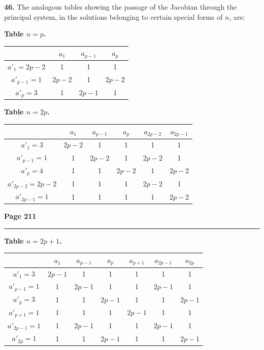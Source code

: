 \documentclass[12pt,a4paper]{article}
\theoremstyle{plain}
\theoremstyle{definition}
\theoremstyle{remark}
\begin{document}
\textbf{46.} The analogous tables showing the passage of the Jacobian through the principal system, in the solutions belonging to certain special forms of $n$, are:

\smallskip

\noindent\textbf{Table $n = p$.}

\begin{tabular}{c|ccc}
 & $a_1$ & $a_{p-1}$ & $a_p$ \\
\hline
$a'_1 = 2p-2$ & 1 & 1 & 1 \\
$a'_{p-1} = 1$ & $2p-2$ & 1 & $2p-2$ \\
$a'_p = 3$ & 1 & $2p-1$ & 1 \\
\end{tabular}

\smallskip

\noindent\textbf{Table $n = 2p$.}

\begin{tabular}{c|ccccc}
 & $a_1$ & $a_{p-1}$ & $a_p$ & $a_{2p-2}$ & $a_{2p-1}$ \\
\hline
$a'_1 = 3$ & $2p-2$ & 1 & 1 & 1 & 1 \\
$a'_{p-1} = 1$ & 1 & $2p-2$ & 1 & $2p-2$ & 1 \\
$a'_p = 4$ & 1 & 1 & $2p-2$ & 1 & $2p-2$ \\
$a'_{2p-2} = 2p-2$ & 1 & 1 & 1 & $2p-2$ & 1 \\
$a'_{2p-1} = 1$ & 1 & 1 & 1 & 1 & $2p-2$ \\
\end{tabular}

\newpage
\noindent\textbf{Page 211}\\
\noindent\rule{\textwidth}{0.4pt}

\smallskip

\noindent\textbf{Table $n = 2p + 1$.}

\begin{tabular}{c|cccccc}
 & $a_1$ & $a_{p-1}$ & $a_p$ & $a_{p+1}$ & $a_{2p-1}$ & $a_{2p}$ \\
\hline
$a'_1 = 3$ & $2p-1$ & 1 & 1 & 1 & 1 & 1 \\
$a'_{p-1} = 1$ & 1 & $2p-1$ & 1 & 1 & $2p-1$ & 1 \\
$a'_p = 3$ & 1 & 1 & $2p-1$ & 1 & 1 & $2p-1$ \\
$a'_{p+1} = 1$ & 1 & 1 & 1 & $2p-1$ & 1 & 1 \\
$a'_{2p-1} = 1$ & 1 & $2p-1$ & 1 & 1 & $2p-1$ & 1 \\
$a'_{2p} = 1$ & 1 & 1 & $2p-1$ & 1 & 1 & $2p-1$ \\
\end{tabular}
\end{document}
